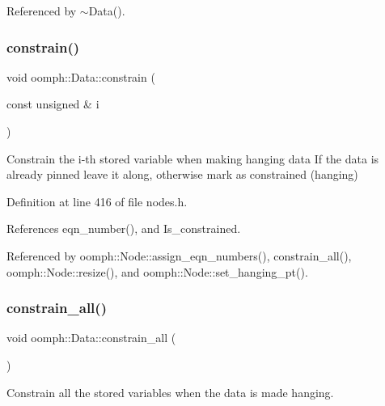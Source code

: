Referenced by $\sim$\+Data().

\mbox{\label{classoomph_1_1Data_a210c28ac93988dd8dbbbd944f6138c35}} 
\subsubsection{\texorpdfstring{constrain()}{constrain()}}
{\footnotesize\ttfamily void oomph\+::\+Data\+::constrain (\begin{DoxyParamCaption}\item[{const unsigned \&}]{i }\end{DoxyParamCaption})\hspace{0.3cm}{\ttfamily [inline]}}



Constrain the i-\/th stored variable when making hanging data If the data is already pinned leave it along, otherwise mark as constrained (hanging) 



Definition at line 416 of file nodes.\+h.



References eqn\+\_\+number(), and Is\+\_\+constrained.



Referenced by oomph\+::\+Node\+::assign\+\_\+eqn\+\_\+numbers(), constrain\+\_\+all(), oomph\+::\+Node\+::resize(), and oomph\+::\+Node\+::set\+\_\+hanging\+\_\+pt().

\mbox{\label{classoomph_1_1Data_ab8a322d75fc3e744cc6c9e945232ff4e}} 
\subsubsection{\texorpdfstring{constrain\+\_\+all()}{constrain\_all()}}
{\footnotesize\ttfamily void oomph\+::\+Data\+::constrain\+\_\+all (\begin{DoxyParamCaption}{ }\end{DoxyParamCaption})\hspace{0.3cm}{\ttfamily [inline]}}



Constrain all the stored variables when the data is made hanging. 



